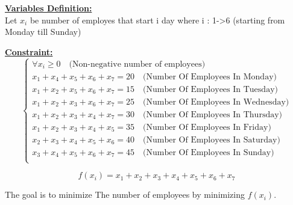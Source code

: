 \vspace{0.5cm}
\begin{minipage}[t]{0.45\textwidth}
    \textbf{\underline{Variables Definition:}} \\[1em] %

    Let \(x_i\) be number of employes that start i day where i : 1-\textgreater 6 (starting from Monday till Sunday)   \\
    
\end{minipage}%
\hfill %
\begin{minipage}[t]{0.45\textwidth}
    \textbf{\underline{Constraint:}} \\[1em]
    \[
    \left\{
        \begin{array}{l}
            \forall x_i \geq 0 \quad \text{(Non-negative number of employees)}\\
            x_1 + x_4 + x_5 + x_6 + x_7 = 20 \quad \text{(Number Of Employees In Monday)}\\
            x_1 + x_2 + x_5 + x_6 + x_7 = 15 \quad \text{(Number Of Employees In Tuesday)}\\
            x_1 + x_2 + x_3 + x_6 + x_7 = 25 \quad \text{(Number Of Employees In Wednesday)}\\
            x_1 + x_2 + x_3 + x_4 + x_7 = 30 \quad \text{(Number Of Employees In Thursday)}\\
            x_1 + x_2 + x_3 + x_4 + x_5 = 35 \quad \text{(Number Of Employees In Friday)}\\
            x_2 + x_3 + x_4 + x_5 + x_6 = 40 \quad \text{(Number Of Employees In Saturday)}\\
            x_3 + x_4 + x_5 + x_6 + x_7 = 45 \quad \text{(Number Of Employees In Sunday)}\\
        \end{array}
    \right.
    \]
\end{minipage}
\vspace{0.5cm}

\begin{tcolorbox}[title = Objectif Function]
\[
f(x_i) = x_1 + x_2 + x_3 + x_4 + x_5 + x_6 + x_7
\]
\begin{center}
The goal is to minimize The number of employees by minimizing \(f(x_i)\).
\end{center}
\end{tcolorbox}

